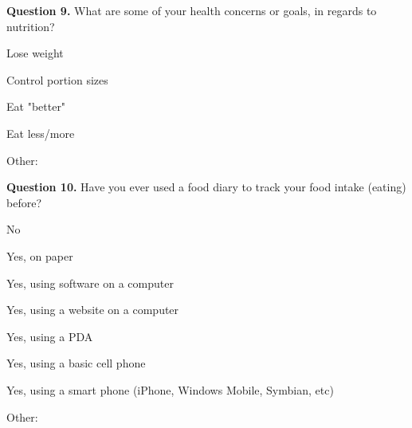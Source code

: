 \noindent\textbf{Question 9.}
What are some of your health concerns or goals, in regards to nutrition?

\begin{itemize*}
\item	Lose weight
\item	Control portion sizes
\item	Eat "better"
\item	Eat less/more
\item	Other:  
\end{itemize*}

\noindent\textbf{Question 10.}
Have you ever used a food diary to track your food intake (eating) before?

\begin{itemize*}
\item	No
\item	Yes, on paper
\item	Yes, using software on a computer
\item	Yes, using a website on a computer
\item	Yes, using a PDA
\item	Yes, using a basic cell phone
\item	Yes, using a smart phone (iPhone, Windows Mobile, Symbian, etc)
\item	Other:  
\end{itemize*}

